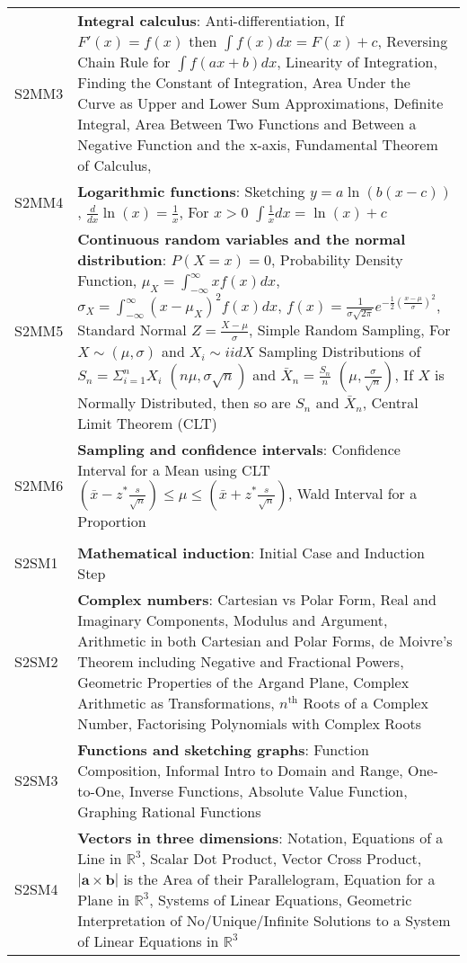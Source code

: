 \documentclass[varwidth=144mm, 12pt]{standalone}
\begin{document}
\begin{longtable}{lp{}}
S2MM3 & \textbf{Integral calculus}: Anti-differentiation, If $F'(x) = f(x)$ then $\int{f(x)dx} = F(x) + c$, Reversing Chain Rule for $\int{f(ax + b)dx}$, Linearity of Integration, Finding the Constant of Integration, Area Under the Curve as Upper and Lower Sum Approximations, Definite Integral, Area Between Two Functions and Between a Negative Function and the x-axis, Fundamental Theorem of Calculus,  \\
S2MM4 & \textbf{Logarithmic functions}: Sketching $y = a\ln(b(x-c))$, $\frac{d}{dx}\ln(x) = \frac{1}{x}$, For $x > 0$ $\int{\frac{1}{x}dx} = \ln(x) + c$ \\
S2MM5 & \textbf{Continuous random variables and the normal distribution}: $P(X = x) = 0$, Probability Density Function, $\mu_X = \int_{-\infty}^{\infty}{xf(x)dx}$, $\sigma_X = \int_{-\infty}^{\infty}{(x - \mu_X)^2f(x)dx}$, $f(x) = \frac{1}{\sigma\sqrt{2\pi}}e^{-\frac{1}{2}\left( \frac{x-\mu}{\sigma}\right)^2}$, Standard Normal $Z = \frac{X - \mu}{\sigma}$, Simple Random Sampling, For $X \sim (\mu, \sigma)$ and $X_i \sim iid X$ Sampling Distributions of $S_n = \Sigma_{i = 1}^{n}{X_i}$ $(n\mu,\sigma\sqrt{n})$ and $\bar{X}_n = \frac{S_n}{n}$ $(\mu,\frac{\sigma}{\sqrt{n}})$, If $X$ is Normally Distributed, then so are $S_n$ and $\bar{X}_n$, Central Limit Theorem (CLT) \\
S2MM6 & \textbf{Sampling and confidence intervals}: Confidence Interval for a Mean using CLT $\left(\bar{x} - z^*\frac{s}{\sqrt{n}} \right) \leq \mu \leq \left( \bar{x} + z^*\frac{s}{\sqrt{n}}\right)$, Wald Interval for a Proportion  \\
& \\
S2SM1 & \textbf{Mathematical induction}: Initial Case and Induction Step \\
S2SM2 & \textbf{Complex numbers}: Cartesian vs Polar Form, Real and Imaginary Components, Modulus and Argument, Arithmetic in both Cartesian and Polar Forms, de Moivre's Theorem including Negative and Fractional Powers, Geometric Properties of the Argand Plane, Complex Arithmetic as Transformations, $n^{\text{th}}$ Roots of a Complex Number, Factorising Polynomials with Complex Roots \\
S2SM3 & \textbf{Functions and sketching graphs}: Function Composition, Informal Intro to Domain and Range, One-to-One, Inverse Functions, Absolute Value Function, Graphing Rational Functions \\
S2SM4 & \textbf{Vectors in three dimensions}: Notation, Equations of a Line in $\mathbb{R}^3$, Scalar Dot Product, Vector Cross Product, $|\mathbf{a} \times \mathbf{b}|$ is the Area of their Parallelogram, Equation for a Plane in $\mathbb{R}^3$, Systems of Linear Equations, Geometric Interpretation of No/Unique/Infinite Solutions to a System of Linear Equations in $\mathbb{R}^3$ \\

\end{longtable}
\end{document}
